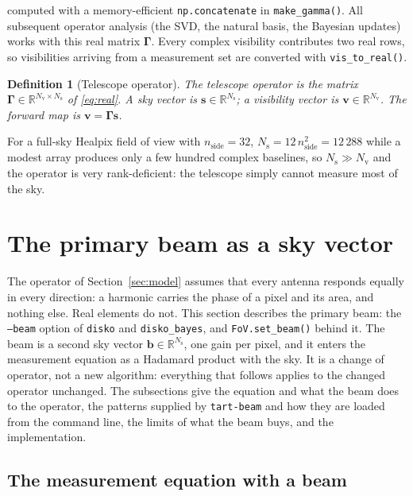 \documentclass[11pt,a4paper]{article}
\newtheorem{definition}{Definition}
\newcommand{\R}{\mathbb{R}}
\newcommand{\Ns}{N_{\mathrm{s}}}
\newcommand{\Nv}{N_{\mathrm{v}}}
\newcommand{\Gammam}{\boldsymbol{\Gamma}}
\newcommand{\svec}{\boldsymbol{s}}
\newcommand{\vvec}{\boldsymbol{v}}
\newcommand{\bvec}{\boldsymbol{b}}
\begin{document}
computed with a memory-efficient \texttt{np.concatenate} in
\texttt{make\_gamma()}. All subsequent operator analysis (the SVD, the natural
basis, the Bayesian updates) works with this real matrix $\Gammam$. Every
complex visibility contributes two real rows, so visibilities arriving from a
measurement set are converted with \texttt{vis\_to\_real()}.

\begin{definition}[Telescope operator]
  \label{def:operator}
  The \emph{telescope operator} is the matrix $\Gammam\in\R^{\Nv\times\Ns}$ of
  \eqref{eq:real}. A \emph{sky vector} is $\svec\in\R^{\Ns}$; a
  \emph{visibility vector} is $\vvec\in\R^{\Nv}$. The forward map is
  $\vvec=\Gammam\svec$.
\end{definition}

For a full-sky Healpix field of view with $n_\mathrm{side}=32$,
$\Ns=12\,n_\mathrm{side}^2=12\,288$ while a modest array produces only a few
hundred complex baselines, so $\Ns\gg\Nv$ and the operator is very
rank-deficient: the telescope simply cannot measure most of the sky.

\section{The primary beam as a sky vector}
\label{sec:beam}

The operator of Section~\ref{sec:model} assumes that every antenna responds
equally in every direction: a harmonic carries the phase of a pixel and its
area, and nothing else. Real elements do not. This section describes the
primary beam: the \texttt{--beam} option of \texttt{disko} and
\texttt{disko\_bayes}, and \texttt{FoV.set\_beam()} behind it. The beam is a
second sky vector $\bvec\in\R^{\Ns}$, one gain per pixel, and it enters the
measurement equation as a Hadamard product with the sky. It is a change of
operator, not a new algorithm: everything that follows applies to the
changed operator unchanged. The subsections give the equation and what the
beam does to the operator, the patterns supplied by \texttt{tart-beam} and
how they are loaded from the command line, the limits of what the beam buys,
and the implementation.

\subsection{The measurement equation with a beam}
\label{sec:beameq}
\end{document}
